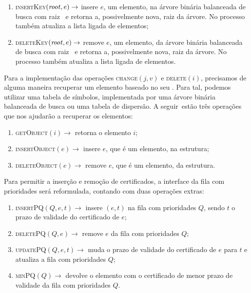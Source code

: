 \begin{enumerate}
    \item \textsc{insertKey}$(\text{\textit{root}},e)\rightarrow$ insere
    $e$, um elemento, na árvore binária balanceada de busca com raiz
    \raiz~e retorna a, possivelmente nova, raiz da árvore.
    No processo também atualiza a lista ligada de elementos;

    \item \textsc{deleteKey}$(\text{\textit{root}},e)\rightarrow$ remove
    $e$, um elemento, da árvore binária balanceada de busca com raiz
    \raiz~e retorna a, possivelmente nova, raiz da árvore.
    No processo também atualiza a lista ligada de elementos.

\end{enumerate}
Para a implementação das operações \textsc{change}$(j, v)$ e
\textsc{delete}$(i)$, precisamos de alguma maneira recuperar um
elemento baseado no seu \id.
Para tal, podemos utilizar uma tabela de símbolos, implementada por uma árvore binária balanceada
de busca ou uma tabela de dispersão.
A seguir~estão três operações que nos ajudarão a recuperar os elementos:

\begin{enumerate}
    \item \textsc{getObject}$(i)\rightarrow$ retorna o elemento $i$;
    \item \textsc{insertObject}$(e) \rightarrow$ insere $e$,
    que é um elemento, na estrutura;
    \item \textsc{deleteObject}$(e) \rightarrow$ remove $e$,
    que é um elemento, da estrutura.
\end{enumerate}

Para permitir a inserção e remoção de certificados, a interface da
fila com prioridades será reformulada, contando com duas operações
extras:

\begin{enumerate}
    \item \textsc{insertPQ}$(Q, e, t) \rightarrow$ insere $(e, t)$
    na fila com prioridades $Q$, sendo $t$ o prazo de validade do certificado de $e$;
    \item \textsc{deletePQ}$(Q, e) \rightarrow$ remove $e$
    da fila com prioridades $Q$;
    \item \textsc{updatePQ}$(Q,e,t) \rightarrow$ muda o prazo de
    validade do certificado de $e$ para $t$ e atualiza a fila com
    prioridades $Q$;
    \item \textsc{minPQ}$(Q) \rightarrow$ devolve o elemento com o
    certificado de menor prazo de validade da fila com prioridades
    $Q$.
\end{enumerate}

